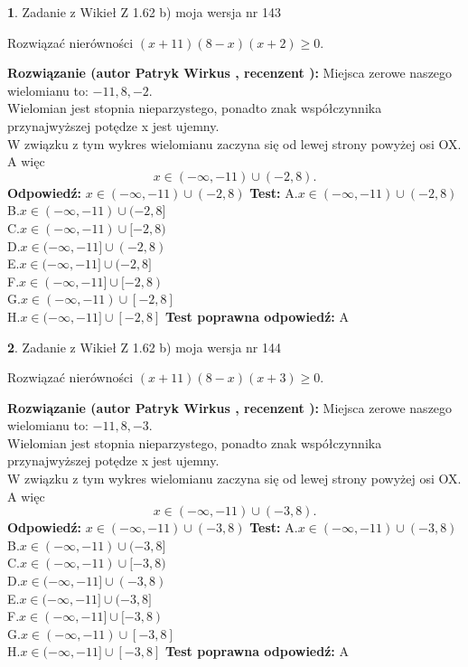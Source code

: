 \documentclass[12pt, a4paper]{article}
\theoremstyle{definition} %
\newtheorem{zad}{}
\newcommand{\zadStart}[1]{\begin{zad}#1\newline}
\newcommand{\zadStop}{\end{zad}}
\newcommand{\rozwStart}[2]{\noindent \textbf{Rozwiązanie (autor #1 , recenzent #2): }\newline}
\newcommand{\rozwStop}{\newline}
\newcommand{\odpStart}{\noindent \textbf{Odpowiedź:}\newline}
\newcommand{\odpStop}{\newline}
\newcommand{\testStart}{\noindent \textbf{Test:}\newline}
\newcommand{\testStop}{\newline}
\newcommand{\kluczStart}{\noindent \textbf{Test poprawna odpowiedź:}\newline}
\newcommand{\kluczStop}{\newline}
\begin{document}
\zadStart{Zadanie z Wikieł Z 1.62 b) moja wersja nr 143}

Rozwiązać nierówności $(x+11)(8-x)(x+2)\ge0$.
\zadStop
\rozwStart{Patryk Wirkus}{}
Miejsca zerowe naszego wielomianu to: $-11, 8, -2$.\\
Wielomian jest stopnia nieparzystego, ponadto znak współczynnika przy\linebreak najwyższej potędze x jest ujemny.\\ W związku z tym wykres wielomianu zaczyna się od lewej strony powyżej osi OX. A więc $$x \in (-\infty,-11) \cup (-2,8).$$
\rozwStop
\odpStart
$x \in (-\infty,-11) \cup (-2,8)$
\odpStop
\testStart
A.$x \in (-\infty,-11) \cup (-2,8)$\\
B.$x \in (-\infty,-11) \cup (-2,8]$\\
C.$x \in (-\infty,-11) \cup [-2,8)$\\
D.$x \in (-\infty,-11] \cup (-2,8)$\\
E.$x \in (-\infty,-11] \cup (-2,8]$\\
F.$x \in (-\infty,-11] \cup [-2,8)$\\
G.$x \in (-\infty,-11) \cup [-2,8]$\\
H.$x \in (-\infty,-11] \cup [-2,8]$
\testStop
\kluczStart
A
\kluczStop



\zadStart{Zadanie z Wikieł Z 1.62 b) moja wersja nr 144}

Rozwiązać nierówności $(x+11)(8-x)(x+3)\ge0$.
\zadStop
\rozwStart{Patryk Wirkus}{}
Miejsca zerowe naszego wielomianu to: $-11, 8, -3$.\\
Wielomian jest stopnia nieparzystego, ponadto znak współczynnika przy\linebreak najwyższej potędze x jest ujemny.\\ W związku z tym wykres wielomianu zaczyna się od lewej strony powyżej osi OX. A więc $$x \in (-\infty,-11) \cup (-3,8).$$
\rozwStop
\odpStart
$x \in (-\infty,-11) \cup (-3,8)$
\odpStop
\testStart
A.$x \in (-\infty,-11) \cup (-3,8)$\\
B.$x \in (-\infty,-11) \cup (-3,8]$\\
C.$x \in (-\infty,-11) \cup [-3,8)$\\
D.$x \in (-\infty,-11] \cup (-3,8)$\\
E.$x \in (-\infty,-11] \cup (-3,8]$\\
F.$x \in (-\infty,-11] \cup [-3,8)$\\
G.$x \in (-\infty,-11) \cup [-3,8]$\\
H.$x \in (-\infty,-11] \cup [-3,8]$
\testStop
\kluczStart
A
\kluczStop
\end{document}

